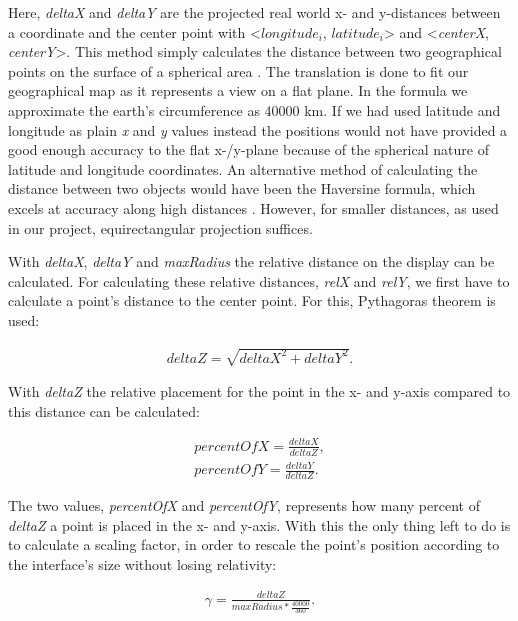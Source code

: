Here, \textit{deltaX} and \textit{deltaY} are the projected real world x- and y-distances between a coordinate and the center point with <$longitude_i$, $latitude_i$> and <\textit{centerX}, \textit{centerY}>. This method simply calculates the distance between two geographical points on the surface of a spherical area \cite{equi}. The translation is done to fit our geographical map as it represents a view on a flat plane. In the formula we approximate the earth's circumference as 40000 km. If we had used latitude and longitude as plain \textit{x} and \textit{y} values instead the positions would not have provided a good enough accuracy to the flat x-/y-plane because of the spherical nature of latitude and longitude coordinates. An alternative method of calculating the distance between two objects would have been the Haversine formula, which excels at accuracy along high distances \cite{haversine}. However, for smaller distances, as used in our project, equirectangular projection suffices.

With \textit{deltaX}, \textit{deltaY} and \textit{maxRadius} the relative distance on the display can be calculated. For calculating these relative distances, \textit{relX} and \textit{relY}, 
we first have to calculate a point's distance to the center point. For this, Pythagoras theorem is used:

\begin{align}
\label{eq:deltaZ}
deltaZ = \sqrt{deltaX^2 + deltaY^2}.
\end{align}

With \textit{deltaZ} the relative placement for the point in the x- and y-axis compared to this distance can be calculated:

\begin{align}
\label{eq:percent}
percentOfX = \frac{deltaX}{deltaZ}, \\
percentOfY = \frac{deltaY}{deltaZ}. \nonumber
\end{align}

The two values,  \textit{percentOfX} and \textit{percentOfY},  represents how many percent of \textit{deltaZ} a point is placed in the x- and y-axis. With this the only thing left to do is to calculate a scaling factor, in order to rescale the point's position according to the interface's size without losing relativity: 

\begin{align}
\label{eq:scalingFactor}
\gamma = \frac{deltaZ}{maxRadius*\frac{40000}{360}}.
\end{align}

